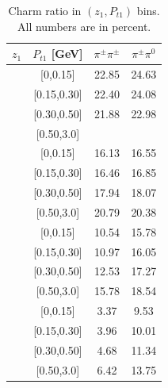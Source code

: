 \documentclass[aps,prX,preprint,groupedaddress,linenumbers]{revtex4-1}
\begin{document}
\begin{table}[h]
\centering
\begin{tabular}{|c|c|c|c|}
\hline
$z_1$ & $P_{t1}$ [GeV] &$\pi^{\pm}\pi^{\pm}$ & $\pi^{\pm}\pi^0$ \\ \hline\hline
[0.2,0.3]	&	[0,0.15]	&	22.85	&	24.63	\\ \hline
[0.2,0.3]	&	[0.15,0.30]	&	22.40	&	24.08	\\ \hline
[0.2,0.3]	&	[0.30,0.50]	&	21.88	&	22.98	\\ \hline
[0.2,0.3]	&	[0.50,3.0]	&		&		\\ \hline\hline
[0.3,0.5]	&	[0,0.15]	&	16.13	&	16.55	\\ \hline
[0.3,0.5]	&	[0.15,0.30]	&	16.46	&	16.85	\\ \hline
[0.3,0.5]	&	[0.30,0.50]	&	17.94	&	18.07	\\ \hline
[0.3,0.5]	&	[0.50,3.0]	&	20.79	&	20.38	\\ \hline\hline
[0.5,0.7]	&	[0,0.15]	&	10.54	&	15.78	\\ \hline
[0.5,0.7]	&	[0.15,0.30]	&	10.97	&	16.05	\\ \hline
[0.5,0.7]	&	[0.30,0.50]	&	12.53	&	17.27	\\ \hline
[0.5,0.7]	&	[0.50,3.0]	&	15.78	&	18.54	\\ \hline\hline
[0.7,1.0]	&	[0,0.15]	&	3.37	&	9.53	\\ \hline
[0.7,1.0]	&	[0.15,0.30]	&	3.96	&	10.01	\\ \hline
[0.7,1.0]	&	[0.30,0.50]	&	4.68	&	11.34	\\ \hline
[0.7,1.0]	&	[0.50,3.0]	&	6.42	&	13.75	\\ \hline
\end{tabular}
\caption[Charm ratio in $(z_{1},P_{t1})$ bins]{Charm ratio in $(z_{1},P_{t1})$ bins. All numbers are in percent.}
\label{tab:zptcharmratio}
\end{table}
\end{document}

